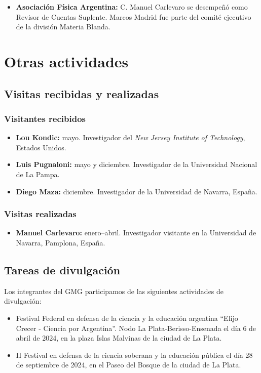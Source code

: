 \documentclass[a4paper,11pt,twoside,final,titlepage,onecolumn,openright]{report}
\begin{document}
\begin{itemize}
\item \textbf{Asociación Física Argentina:} C. Manuel Carlevaro se desempeñó como Revisor de Cuentas Suplente. Marcos Madrid fue parte del comité ejecutivo de la división Materia Blanda.
 
\end{itemize}


\section{Otras actividades}

\subsection{Visitas recibidas y realizadas}

\subsubsection{Visitantes recibidos}

\begin{itemize}
 \item \textbf{Lou Kondic:} mayo. Investigador del \textit{New Jersey Institute of Technology}, Estados Unidos.
 \item {\bf Luis Pugnaloni:} mayo y diciembre. Investigador de la Universidad Nacional de La Pampa.
 \item {\bf Diego Maza:} diciembre. Investigador de la Universidad de Navarra, España.
\end{itemize}

\subsubsection{Visitas realizadas}
 
 \begin{itemize}
  \item {\bf Manuel Carlevaro:} enero--abril. Investigador visitante en la Universidad de Navarra, Pamplona, España.
 \end{itemize}


\subsection{Tareas de divulgación}
Los integrantes del GMG participamos de las siguientes actividades de divulgación:

\begin{itemize}
  \item Festival Federal en defensa de la ciencia y la educación argentina  “Elijo Crecer - Ciencia por Argentina”. Nodo La Plata-Berisso-Ensenada el día 6 de abril de 2024, en la plaza Islas Malvinas de la ciudad de La Plata.

  \item II Festival en defensa de la ciencia soberana y la educación pública el día 28 de septiembre de 2024, en el Paseo del Bosque de la ciudad de La Plata.
\end{itemize}
\end{document}
